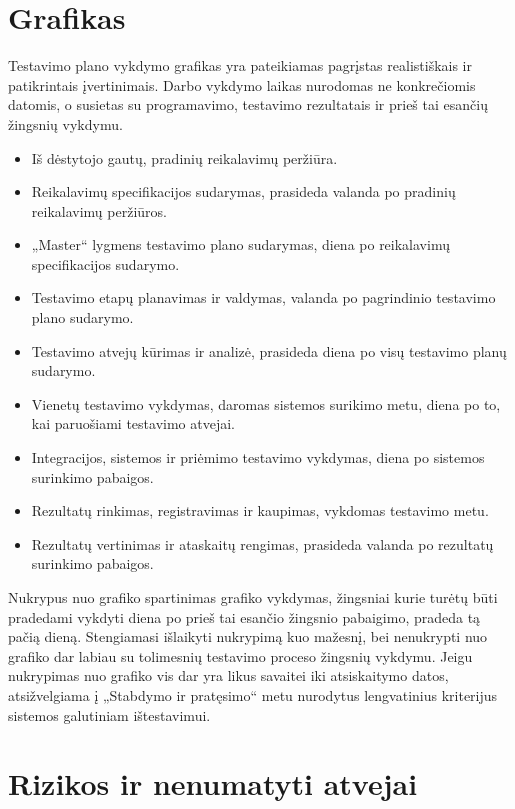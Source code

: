 \section{Grafikas}

Testavimo plano vykdymo grafikas yra pateikiamas pagrįstas realistiškais ir patikrintais įvertinimais.
Darbo vykdymo laikas nurodomas ne konkrečiomis datomis, o susietas su programavimo, testavimo rezultatais ir prieš tai esančių žingsnių vykdymu.

\begin{itemize}
	\item Iš dėstytojo gautų, pradinių reikalavimų peržiūra.
	\item Reikalavimų specifikacijos sudarymas, prasideda valanda po pradinių reikalavimų peržiūros.
	\item „Master“ lygmens testavimo plano sudarymas, diena po reikalavimų specifikacijos sudarymo.
	\item Testavimo etapų planavimas ir valdymas, valanda po pagrindinio testavimo plano sudarymo.
	\item Testavimo atvejų kūrimas ir analizė, prasideda diena po visų testavimo planų sudarymo.
	\item Vienetų testavimo vykdymas, daromas sistemos surikimo metu, diena po to, kai paruošiami testavimo atvejai.
	\item Integracijos, sistemos ir priėmimo testavimo vykdymas, diena po sistemos surinkimo pabaigos.
	\item Rezultatų rinkimas, registravimas ir kaupimas, vykdomas testavimo metu.
	\item Rezultatų vertinimas ir ataskaitų rengimas, prasideda valanda po rezultatų surinkimo pabaigos.
\end{itemize}

Nukrypus nuo grafiko spartinimas grafiko vykdymas, žingsniai kurie turėtų būti pradedami vykdyti diena po prieš tai esančio žingsnio pabaigimo, pradeda tą pačią dieną. 
Stengiamasi išlaikyti nukrypimą kuo mažesnį, bei nenukrypti nuo grafiko dar labiau su tolimesnių testavimo proceso žingsnių vykdymu. 
Jeigu nukrypimas  nuo grafiko vis dar yra likus savaitei iki atsiskaitymo datos, atsižvelgiama į „Stabdymo ir pratęsimo“ metu nurodytus lengvatinius kriterijus sistemos galutiniam ištestavimui.

\section{Rizikos ir nenumatyti atvejai}

